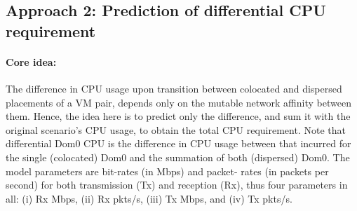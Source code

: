 \subsection{Approach 2: Prediction of differential CPU requirement}
\paragraph{Core idea: }
The difference in CPU usage upon transition between
colocated and dispersed placements of a VM pair, depends only on the mutable
network affinity between them. Hence, the idea here is to predict only
the difference, and sum it with the original scenario's CPU usage, to
obtain the total CPU requirement.
Note that differential Dom0 CPU is the difference in CPU 
usage between that incurred for the single (colocated) Dom0 and
the summation of both (dispersed) Dom0.
The model parameters are bit-rates (in Mbps) and packet-
rates (in packets per second) for both transmission (Tx) and reception (Rx), thus four parameters
in all: (i) Rx Mbps, (ii) Rx pkts/s, (iii) Tx Mbps, and (iv) Tx pkts/s. 

